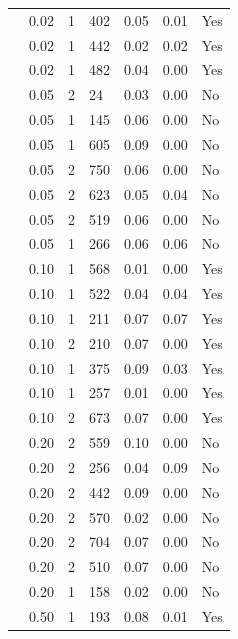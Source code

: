 \begin{longtable}{ | M{2.0cm} | M{2.0cm} | M{1.5cm} | M{1.5cm} | M{2.0cm} | M{2.0cm} | M{1.5cm} | }
                 & 0.02 & 1 & 402 & 0.05 & 0.01 & Yes \\
                 & 0.02 & 1 & 442 & 0.02 & 0.02 & Yes \\
                 & 0.02 & 1 & 482 & 0.04 & 0.00 & Yes \\
                 & 0.05 & 2 & 24  & 0.03 & 0.00 & No  \\
                 & 0.05 & 1 & 145 & 0.06 & 0.00 & No  \\
                 & 0.05 & 1 & 605 & 0.09 & 0.00 & No  \\
                 & 0.05 & 2 & 750 & 0.06 & 0.00 & No  \\
                 & 0.05 & 2 & 623 & 0.05 & 0.04 & No  \\
                 & 0.05 & 2 & 519 & 0.06 & 0.00 & No  \\
                 & 0.05 & 1 & 266 & 0.06 & 0.06 & No  \\
                 & 0.10 & 1 & 568 & 0.01 & 0.00 & Yes \\
                 & 0.10 & 1 & 522 & 0.04 & 0.04 & Yes \\
                 & 0.10 & 1 & 211 & 0.07 & 0.07 & Yes \\
                 & 0.10 & 2 & 210 & 0.07 & 0.00 & Yes \\
                 & 0.10 & 1 & 375 & 0.09 & 0.03 & Yes \\
                 & 0.10 & 1 & 257 & 0.01 & 0.00 & Yes \\
                 & 0.10 & 2 & 673 & 0.07 & 0.00 & Yes \\
                 & 0.20 & 2 & 559 & 0.10 & 0.00 & No  \\
                 & 0.20 & 2 & 256 & 0.04 & 0.09 & No  \\
                 & 0.20 & 2 & 442 & 0.09 & 0.00 & No  \\
                 & 0.20 & 2 & 570 & 0.02 & 0.00 & No  \\
                 & 0.20 & 2 & 704 & 0.07 & 0.00 & No  \\
                 & 0.20 & 2 & 510 & 0.07 & 0.00 & No  \\
                 & 0.20 & 1 & 158 & 0.02 & 0.00 & No  \\
                 & 0.50 & 1 & 193 & 0.08 & 0.01 & Yes \\

\end{longtable}
